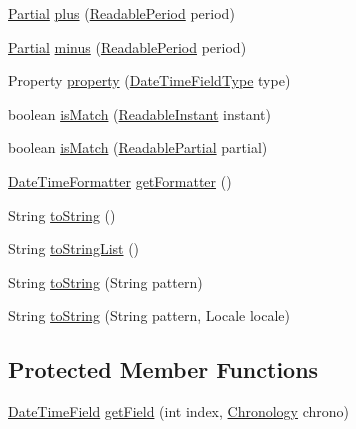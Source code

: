 \begin{DoxyCompactItemize}
\item 
\hyperlink{classorg_1_1joda_1_1time_1_1_partial}{Partial} \hyperlink{classorg_1_1joda_1_1time_1_1_partial_a766b3fd0cdace813ea7e16e9273f619f}{plus} (\hyperlink{interfaceorg_1_1joda_1_1time_1_1_readable_period}{Readable\-Period} period)
\item 
\hyperlink{classorg_1_1joda_1_1time_1_1_partial}{Partial} \hyperlink{classorg_1_1joda_1_1time_1_1_partial_a37eea0cdba713dd468bc98e7bce71ae6}{minus} (\hyperlink{interfaceorg_1_1joda_1_1time_1_1_readable_period}{Readable\-Period} period)
\item 
Property \hyperlink{classorg_1_1joda_1_1time_1_1_partial_a3baa4caeffc43382f9bf0c5a3d6e0f61}{property} (\hyperlink{classorg_1_1joda_1_1time_1_1_date_time_field_type}{Date\-Time\-Field\-Type} type)
\item 
boolean \hyperlink{classorg_1_1joda_1_1time_1_1_partial_a58d6ea7ae840e6af5f5fa342e3cfc3f0}{is\-Match} (\hyperlink{interfaceorg_1_1joda_1_1time_1_1_readable_instant}{Readable\-Instant} instant)
\item 
boolean \hyperlink{classorg_1_1joda_1_1time_1_1_partial_a13bf1fdeae9a24e7a9781b41cb976720}{is\-Match} (\hyperlink{interfaceorg_1_1joda_1_1time_1_1_readable_partial}{Readable\-Partial} partial)
\item 
\hyperlink{classorg_1_1joda_1_1time_1_1format_1_1_date_time_formatter}{Date\-Time\-Formatter} \hyperlink{classorg_1_1joda_1_1time_1_1_partial_afc166abd60a4835d8c3d1696f6a9b792}{get\-Formatter} ()
\item 
String \hyperlink{classorg_1_1joda_1_1time_1_1_partial_a476af83d6fe05fe59e05e1c7ae6cd862}{to\-String} ()
\item 
String \hyperlink{classorg_1_1joda_1_1time_1_1_partial_a989ea06c32b838bf7cd76a8318545d1a}{to\-String\-List} ()
\item 
String \hyperlink{classorg_1_1joda_1_1time_1_1_partial_acd0864a6428cf3494a6cacbc4145995a}{to\-String} (String pattern)
\item 
String \hyperlink{classorg_1_1joda_1_1time_1_1_partial_a72f9e49cac47e8ae18db5997052ef78e}{to\-String} (String pattern, Locale locale)
\end{DoxyCompactItemize}
\subsection*{Protected Member Functions}
\begin{DoxyCompactItemize}
\item 
\hyperlink{classorg_1_1joda_1_1time_1_1_date_time_field}{Date\-Time\-Field} \hyperlink{classorg_1_1joda_1_1time_1_1_partial_acdf8497bd70c6f402340cbb378796e42}{get\-Field} (int index, \hyperlink{classorg_1_1joda_1_1time_1_1_chronology}{Chronology} chrono)
\end{DoxyCompactItemize}



